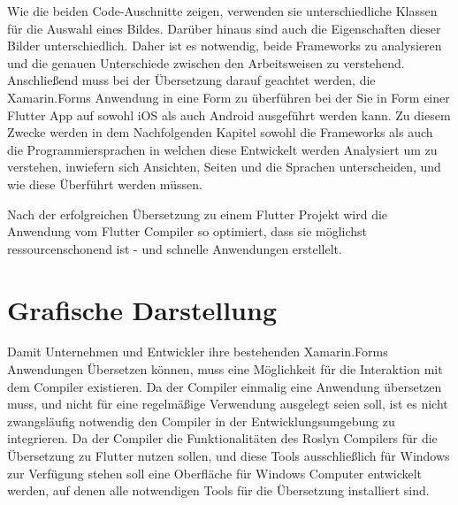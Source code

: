 \begin{minipage}{\linewidth}

\end{minipage}
Wie die beiden Code-Auschnitte zeigen, verwenden sie unterschiedliche Klassen für die Auswahl eines Bildes. Darüber hinaus sind auch die Eigenschaften dieser Bilder unterschiedlich. Daher ist es notwendig,  beide Frameworks zu analysieren und die genauen Unterschiede zwischen den Arbeitsweisen zu verstehend.  Anschließend muss bei der Übersetzung darauf geachtet werden,  die Xamarin.Forms Anwendung in eine Form zu überführen bei der Sie in Form einer Flutter App auf sowohl iOS als auch Android ausgeführt werden kann.  Zu diesem Zwecke werden in dem Nachfolgenden Kapitel sowohl die Frameworks als auch die Programmiersprachen in welchen diese Entwickelt werden Analysiert um zu verstehen,  inwiefern sich Ansichten, Seiten und die Sprachen unterscheiden, und wie diese Überführt werden müssen. 

Nach der erfolgreichen Übersetzung zu einem Flutter Projekt wird die Anwendung vom Flutter Compiler so optimiert, dass sie möglichst ressourcenschonend ist - und schnelle Anwendungen erstellelt. 

\section{Grafische Darstellung}
Damit Unternehmen und Entwickler ihre bestehenden Xamarin.Forms Anwendungen Übersetzen können, muss eine Möglichkeit für die Interaktion mit dem Compiler existieren.  Da der Compiler einmalig eine Anwendung übersetzen muss,  und nicht für eine regelmäßige Verwendung ausgelegt seien soll,  ist es nicht zwangsläufig notwendig den Compiler in der Entwicklungsumgebung zu integrieren.  Da der Compiler die Funktionalitäten des Roslyn Compilers für die Übersetzung zu Flutter nutzen sollen,  und diese Tools ausschließlich für Windows zur Verfügung stehen soll eine Oberfläche für Windows Computer entwickelt werden, auf denen alle notwendigen Tools für die Übersetzung installiert sind. 